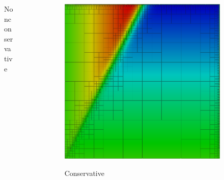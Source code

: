 \documentclass{beamer}
\begin{document}
\begin{frame}
{\begin{columns}
\begin{column}{0.49\textwidth}
\begin{figure}
Nonconservative
\end{figure}
\end{column}
\begin{column}{0.49\textwidth}
\begin{figure}
\centering
\includegraphics[width=1.0\textwidth]{Discontinuous/modified8c.png}

Conservative
\end{figure}
\end{column}
\end{columns}
}
\end{frame}

\end{document}
